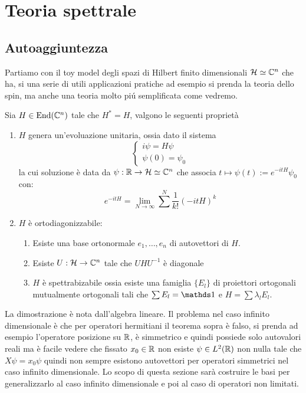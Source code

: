 \chapter{Teoria spettrale}
\section{Autoaggiuntezza}

Partiamo con il toy model degli spazi di Hilbert finito dimensionali $\operatorname{\mathcal{H}} \simeq \mathbb{C}^n$ che ha, si una serie di utili applicazioni pratiche ad esempio si prenda la teoria dello spin, ma anche una teoria molto piú semplificata come vedremo.

\begin{theorem}
    Sia $H \in \operatorname{End}(\mathbb{C}^n)$ tale che $H^*= H$, valgono le seguenti proprietà
\begin{enumerate}
    \item $H$ genera un'evoluazione unitaria, ossia dato il sistema 
    \begin{equation*}
        \begin{cases}
            i \psi = H \psi \\
            \psi(0) = \psi_0
        \end{cases}
    \end{equation*}
    la cui soluzione è data da $\psi : \operatorname{\mathbb{R}} \to \operatorname{\mathcal{H}} \simeq \mathbb{C}^n$ che associa $t \mapsto \psi(t):= e^{-itH}\psi_0$ con:
    $$e^{-itH}= \lim_{N \to \infty} \sum^N  \dfrac{1}{k!}(-itH)^k$$
    \item $H$ è ortodiagonizzabile: 
    \begin{enumerate}
        \item Esiste una base ortonormale ${e_1, \dots, e_n}$ di autovettori di $H$.
        \item Esiste $U : \operatorname{\mathcal{H}} \to \mathbb{C}^n$ tale che $U H U^{-1}$ è diagonale
        \item $H$ è spettrabizabile ossia esiste una famiglia $\{E_l\}$ di proiettori ortogonali mutualmente ortogonali tali che $\sum E_l = \un$ e $H = \sum \lambda_l E_l$.
    \end{enumerate}
\end{enumerate}
\end{theorem}
La dimostrazione è nota dall'algebra lineare.
Il problema nel caso infinito dimensionale è che per operatori hermitiani il teorema sopra è falso, si prenda ad esempio l'operatore posizione su $\operatorname{\mathbb{R}}$, è simmetrico e quindi possiede solo autovalori reali ma è facile vedere che fissato $x_0 \in \operatorname{\mathbb{R}}$ non esiste $\psi \in L^2(\operatorname{\mathbb{R}})$ non nulla tale che $X\psi = x_0\psi$ quindi non sempre esistono autovettori per operatori simmetrici nel caso infinito dimensionale.
Lo scopo di questa sezione sarà costruire le basi per generalizzarlo al caso infinito dimensionale e poi al caso di operatori non limitati.


